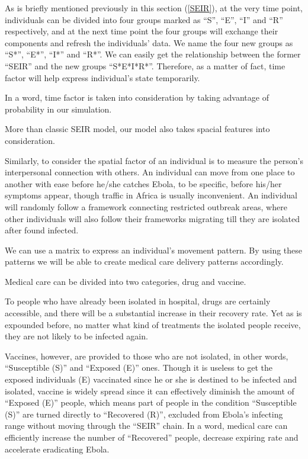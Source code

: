 \documentclass[12pt]{article}
\begin{document}
As is briefly mentioned previously in this section (\ref{SEIR}), at the very time point, individuals can be divided into four groups marked as ``S'', ``E'', ``I'' and ``R'' respectively, and at the next time point the four groups will exchange their components and refresh the individuals’ data. We name the four new groups as ``S*'', ``E*'', ``I*'' and ``R*''. We can easily get the relationship between the former ``SEIR'' and the new groups ``S*E*I*R*''. Therefore, as a matter of fact, time factor will help express individual’s state temporarily.

In a word, time factor is taken into consideration by taking advantage of probability in our simulation.

More than classic SEIR model, our model also takes spacial features into consideration.

Similarly, to consider the spatial factor of an individual is to measure the person’s interpersonal connection with others. An individual can move from one place to another with ease before he/she catches Ebola, to be specific, before his/her symptoms appear, though traffic in Africa is usually inconvenient. An individual will randomly follow a framework connecting restricted outbreak areas, where other individuals will also follow their frameworks migrating till they are isolated after found infected.

We can use a matrix to express an individual’s movement pattern. By using these patterns we will be able to create medical care delivery patterns accordingly.

Medical care can be divided into two categories, drug and vaccine.

To people who have already been isolated in hospital, drugs are certainly accessible, and there will be a substantial increase in their recovery rate. Yet as is expounded before, no matter what kind of treatments the isolated people receive, they are not likely to be infected again.

Vaccines, however, are provided to those who are not isolated, in other words, ``Susceptible (S)'' and ``Exposed (E)'' ones. Though it is useless to get the exposed individuals (E) vaccinated since he or she is destined to be infected and isolated, vaccine is widely spread since it can effectively diminish the amount of ``Exposed (E)'' people, which means part of people in the condition ``Susceptible (S)'' are turned directly to ``Recovered (R)'', excluded from Ebola’s infecting range without moving through the ``SEIR'' chain. In a word, medical care can efficiently increase the number of ``Recovered'' people, decrease expiring rate and accelerate eradicating Ebola.
\end{document}
